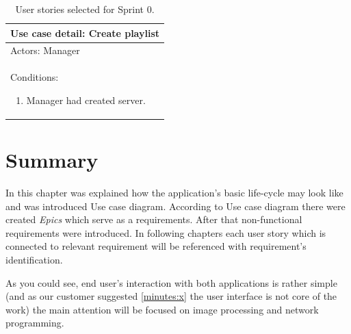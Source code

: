 \begin{table}[!h]
	\def\arraystretch{1.25}
	\caption{User stories selected for Sprint 0. }
	\label{tab:usecase1}
	
	\begin{tabular}{p{\textwidth}}
		\toprule[1mm]
		\textbf{Use case detail: Create playlist} \\
		\midrule	
		Actors: Manager \\
		Conditions:
		
		\begin{enumerate}
			\item Manager had created server.
		\end{enumerate}
		\\
		\bottomrule[1mm]
	\end{tabular}
\end{table}

\section{Summary}
In this chapter was explained how the application's basic life-cycle may look like and was introduced Use case diagram.
According to Use case diagram there were created \emph{Epics} which serve as a requirements. 
After that non-functional requirements were introduced.
In following chapters each user story which is connected to relevant requirement will be referenced with requirement's identification.

As you could see, end user's interaction with both applications is rather simple (and as our customer suggested \ref{minutes:x} the user interface is not core of the work) the main attention will be focused on image processing and network programming.